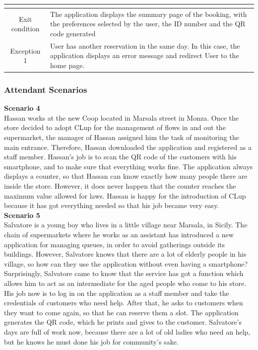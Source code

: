 \documentclass[table, 12pt]{article}
\begin{document}
\begin{longtable}{|c| p{10cm}|}
\begin{itemize}
    \end{itemize}                                                                                                                   \\
    \hline
    Exit condition   & The application displays the summary page of the booking, with the preferences selected by the user, the ID number and the QR code generated
    \\
    \hline
    \hline
    Exception 1      & User has another reservation in the same day. In this case, the application displays an error message and redirect User to the home page.    \\
    \hline
\end{longtable}





\subsubsection{Attendant Scenarios}
\textbf{Scenario 4}\\
Hassan works at the new Coop located in Marsala street in Monza. Once the store decided to adopt CLup for the management of flows in and out the supermarket, the manager of Hassan assigned him the task of monitoring the main entrance. Therefore, Hassan downloaded the application and registered as a staff member. Hassan's job is to scan the QR code of the customers with his smartphone, and to make sure that everything works fine. The application always displays a counter, so that Hassan can know exactly how many people there are inside the store. However, it does never happen that the counter reaches the maximum value allowed for laws. Hassan is happy for the introduction of CLup because it has got everything needed so that his job became very easy.\\

\textbf{Scenario 5}\\
Salvatore is a young boy who lives in a little village near Marsala, in Sicily. The chain of supermarkets where he works as an assistant has introduced a new application for managing queues, in order to avoid gatherings outside its buildings. However, Salvatore knows that there are a lot of elderly people in his village, so how can they use the application without even having a smartphone? Surprisingly, Salvatore came to know that the service has got a function which allows him to act as an intermediate for the aged people who come to his store. His job now is to log in on the application as a staff member and take the credentials of customers who need help. After that, he asks to customers when they want to come again, so that he can reserve them a slot. The application generates the QR code, which he prints and gives to the customer. Salvatore's days are full of work now, because there are a lot of old ladies who need an help, but he knows he must done his job for community's sake.
\newpage
\end{document}
